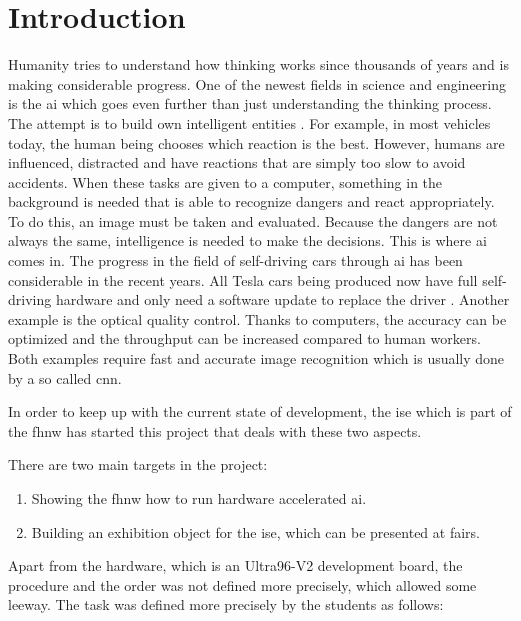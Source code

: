 \chapter*{Introduction}
\label{ch:introduction}

Humanity tries to understand how thinking works since thousands of years and is making considerable progress.
One of the newest fields in science and engineering is the \acrfull{ai} which goes even further than just understanding the thinking process.
The attempt is to build own intelligent entities \cite{ai}.
For example, in most vehicles today, the human being chooses which reaction is the best.
However, humans are influenced, distracted and have reactions that are simply too slow to avoid accidents.
When these tasks are given to a computer, something in the background is needed that is able to recognize dangers and react appropriately.
To do this, an image must be taken and evaluated.
Because the dangers are not always the same, intelligence is needed to make the decisions.
This is where \acrshort{ai} comes in.
The progress in the field of self-driving cars through \acrshort{ai} has been considerable in the recent years.
All Tesla cars being produced now have full self-driving hardware and only need a software update to replace the driver \cite{tesla_self_driving_cars}.
Another example is the optical quality control.
Thanks to computers, the accuracy can be optimized and the throughput can be increased compared to human workers.
Both examples require fast and accurate image recognition which is usually done by a so called \acrfull{cnn}. 

In order to keep up with the current state of development, the \acrfull{ise} which is part of the \acrfull{fhnw} has started this project that deals with these two aspects.

There are two main targets in the project:

\begin{enumerate}
	\item Showing the \acrshort{fhnw} how to run hardware accelerated \acrshort{ai}.
	\item Building an exhibition object for the \acrshort{ise}, which can be presented at fairs. 
\end{enumerate}

Apart from the hardware, which is an Ultra96-V2 development board, the procedure and the order was not defined more precisely, which allowed some leeway.
The task was defined more precisely by the students as follows:

